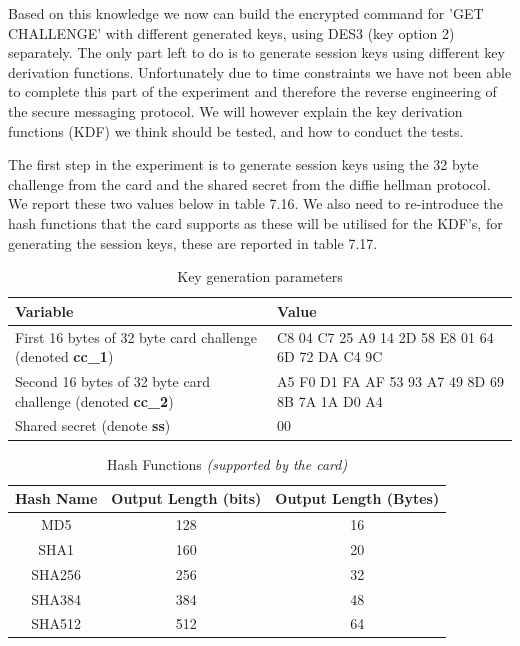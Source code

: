 \documentclass[bsc,frontabs,twoside,singlespacing,parskip,deptreport]{infthesis}     %
\begin{document}
Based on this knowledge we now can build the encrypted command for 'GET CHALLENGE' with different generated keys, using DES3 (key option 2) separately. The only part left to do is to generate session keys using different key derivation functions. Unfortunately due to time constraints we have not been able to complete this part of the experiment and therefore the reverse engineering of the secure messaging protocol. We will however explain the key derivation functions (KDF) we think should be tested, and how to conduct the tests.

The first step in the experiment is to generate session keys using the 32 byte challenge from the card and the shared secret from the diffie hellman protocol. We report these two values below in table 7.16. We also need to re-introduce the hash functions that the card supports as these will be utilised for the KDF's, for generating the session keys, these are reported in table 7.17.

\begin{table}[H]
\begin{tabular}{|p{4cm}|p{10cm}|}
\hline
\textbf{Variable} & \textbf{Value}\\
\hline
First 16 bytes of 32 byte card challenge (denoted \textbf{cc\_1}) & C8 04 C7 25 A9 14 2D 58 E8 01 64 6D 72 DA C4 9C\\
\hline
Second 16 bytes of 32 byte card challenge (denoted \textbf{cc\_2}) & A5 F0 D1 FA AF 53 93 A7 49 8D 69 8B 7A 1A D0 A4\\
\hline
Shared secret (denote \textbf{ss}) & 00\\
\hline
\end{tabular}
\caption{Key generation parameters}
\end{table}

\begin{table}[H]
\begin{center}
\begin{tabular}{|c|c|c|}
\hline
Hash Name & Output Length (bits) & Output Length (Bytes)\\
\hline

MD5 & 128 &16\\
SHA1 & 160 & 20\\
SHA256 & 256 & 32\\
SHA384 & 384 & 48\\
SHA512 & 512 & 64\\
\hline
\end{tabular}
\caption{Hash Functions \textit{(supported by the card)}}
\end{center}
\end{table}
\end{document}
